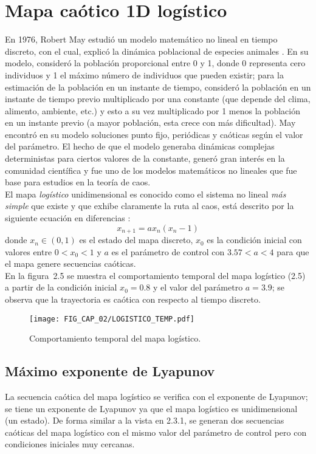 \section{Mapa caótico 1D logístico}
En 1976, Robert May estudió un modelo matemático no lineal en tiempo discreto, con el cual, explicó la dinámica poblacional de especies animales \cite{M_1976}. En su modelo, consideró la población proporcional entre 0 y 1, donde 0 representa cero individuos y 1 el máximo número de individuos que pueden existir; para la estimación de la población en un instante de tiempo, consideró la población en un instante de tiempo previo multiplicado por una constante (que depende del clima, alimento, ambiente, etc.) y esto a su vez multiplicado por 1 menos la población en un instante previo (a mayor población, esta crece con más dificultad). May encontró en su modelo soluciones punto fijo, periódicas y caóticas según el valor del parámetro. El hecho de que el modelo generaba dinámicas complejas deterministas para ciertos valores de la constante, generó gran interés en la comunidad científica y fue uno de los modelos matemáticos no lineales que fue base para estudios en la teoría de caos.  \\   

El mapa \textit{logístico} unidimensional es conocido como el sistema no lineal \textit{más simple} que existe y que exhibe claramente la ruta al caos, está descrito por la siguiente ecuación en diferencias \cite{M_1976}:
\begin{equation}
x_{n+1}=ax_{n}(x_{n}-1)
\end{equation}
donde $x_{n}\in(0,1)$ es el estado del mapa discreto, $x_{0}$ es la condición inicial con valores entre $0< x_{0}<1$ y $a$ es el parámetro de control con $3.57<a<4$ para que el mapa genere secuencias caóticas. \\

En la figura~2.5 se muestra el comportamiento temporal del mapa logístico (2.5) a partir de la condición inicial $x_{0}=0.8$ y el valor del parámetro $a=3.9$; se observa que la trayectoria es caótica con respecto al tiempo discreto.

\begin{figure}[!htbp] %
	\center
	\texttt{[image: FIG\_CAP\_02/LOGISTICO\_TEMP.pdf]} 
	\caption{Comportamiento temporal del mapa logístico.}
\end{figure}

\subsection{Máximo exponente de Lyapunov}
La secuencia caótica del mapa logístico se verifica con el exponente de Lyapunov; se tiene un exponente de Lyapunov ya que el mapa logístico es unidimensional (un estado). De forma similar a la vista en 2.3.1, se generan dos secuencias caóticas del mapa logístico con el mismo valor del parámetro de control pero con condiciones iniciales muy cercanas. \\

